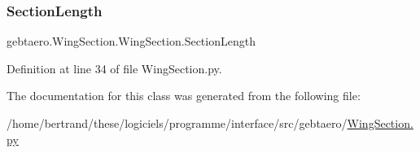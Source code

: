 \subsubsection{\texorpdfstring{Section\+Length}{SectionLength}}
{\footnotesize\ttfamily gebtaero.\+Wing\+Section.\+Wing\+Section.\+Section\+Length}



Definition at line 34 of file Wing\+Section.\+py.



The documentation for this class was generated from the following file\+:\begin{DoxyCompactItemize}
\item 
/home/bertrand/these/logiciels/programme/interface/src/gebtaero/\hyperlink{_wing_section_8py}{Wing\+Section.\+py}\end{DoxyCompactItemize}
